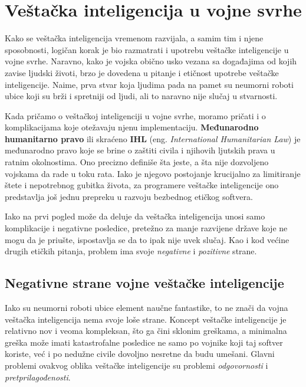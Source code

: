 \documentclass[a4paper]{article}
\begin{document}


\section{Veštačka inteligencija u vojne svrhe}
\label{sec: AI korišćen u vojne svrhe}
Kako se veštačka inteligencija vremenom razvijala, a samim tim i njene sposobnosti, logičan korak je bio razmatrati i upotrebu veštačke inteligencije u vojne svrhe. Naravno, kako je vojska obično usko vezana sa događajima od kojih zavise ljudski životi, brzo je dovedena u pitanje i etičnost upotrebe veštačke inteligencije. Naime, prva stvar koja ljudima pada na pamet su neumorni roboti ubice koji su brži i spretniji od ljudi, ali to naravno nije slučaj u stvarnosti.

Kada pričamo o veštačkoj inteligenciji u vojne svrhe, moramo pričati i o komplikacijama koje otežavaju njenu implementaciju. \textbf{Međunarodno humanitarno pravo} ili skraćeno \textbf{IHL} (eng. \textit{International Humanitarian Law}) je međunarodno pravo koje se brine o zaštiti civila i njihovih ljutskih prava u ratnim okolnostima. Ono precizno definiše šta jeste, a šta nije dozvoljeno vojskama da rade u toku rata. Iako je njegovo postojanje krucijalno za limitiranje štete i nepotrebnog gubitka života, za programere veštačke inteligencije ono predstavlja još jednu prepreku u razvoju bezbednog etičkog softvera. \cite{ihl}

Iako na prvi pogled može da deluje da veštačka inteligencija unosi samo komplikacije i negativne posledice, pretežno za manje razvijene države koje ne mogu da je priušte, ispostavlja se da to ipak nije uvek slučaj. Kao i kod većine drugih etičkih pitanja, problem ima svoje \emph{negativne} i \emph{pozitivne} strane.
\subsection{Negativne strane vojne veštačke inteligencije}
\label{subsec: Negativne strane vojne veštačke inteligencije}
Iako su neumorni roboti ubice element naučne fantastike, to ne znači da vojna veštačka inteligencija nema svoje loše strane. Koncept veštačke inteligencije je relativno nov i veoma kompleksan, što ga čini sklonim greškama, a minimalna greška može imati katastrofalne posledice ne samo po vojnike koji taj softver koriste, već i po nedužne civile dovoljno nesretne da budu umešani. Glavni problemi ovakvog oblika veštačke inteligencije su problemi \emph{odgovornosti} i \emph{pretprilagođenosti}. \cite{military_ai_problems}
\end{document}
